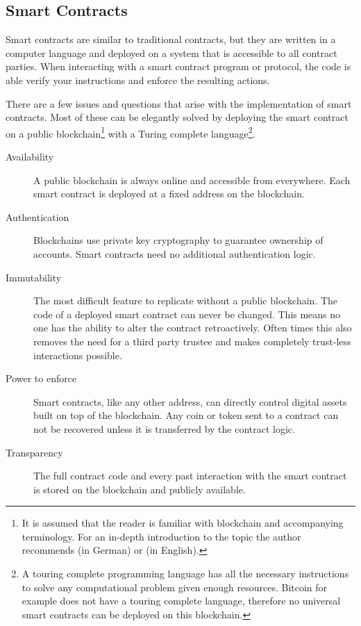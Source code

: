 \documentclass[12pt,a4paper,titlepage,oneside,english]{article}
\begin{document}
\subsection{Smart Contracts}
\label{sub:smart-contracts}
Smart contracts are similar to traditional contracts, but they are written in a computer language and deployed on a system that is accessible to all contract parties. When interacting with a smart contract program or protocol, the code is able verify your instructions and enforce the resulting actions.

There are a few issues and questions that arise with the implementation of smart contracts. Most of these can be elegantly solved by deploying the smart contract on a public blockchain\footnote{It is assumed that the reader is familiar with blockchain and accompanying terminology. For an in-depth introduction to the topic the author recommends \cite{Schaer2017} (in German) or \cite{Lewis2018} (in English).} with a Turing complete language\footnote{A touring complete programming language has all the necessary instructions to solve any computational problem given enough resources. Bitcoin for example does not have a touring complete language, therefore no universal smart contracts can be deployed on this blockchain.}.


\begin{description}
	\item[Availability] A public blockchain is always online and accessible from everywhere. Each smart contract is deployed at a fixed address on the blockchain.
	\item[Authentication] Blockchains use private key cryptography to guarantee ownership of accounts. Smart contracts need no additional authentication logic.
	\item[Immutability] The most difficult feature to replicate without a public blockchain. The code of a deployed smart contract can never be changed. This means no one has the ability to alter the contract retroactively. Often times this also removes the need for a third party trustee and makes completely trust-less interactions possible.
	\item[Power to enforce] Smart contracts, like any other address, can directly control digital assets built on top of the blockchain. Any coin or token sent to a contract can not be recovered  unless it is transferred by the contract logic.
	\item[Transparency] The full contract code and every past interaction with the smart contract is stored on the blockchain and publicly available.
\end{description}
\end{document}
